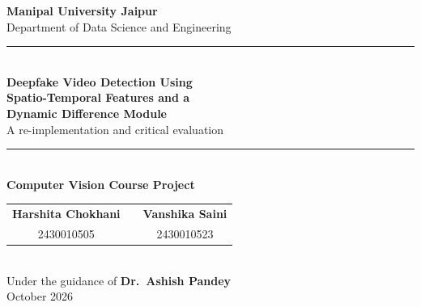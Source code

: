 \documentclass[11pt,a4paper]{article}
\begin{document}
\begin{center}
{\large\textbf{Manipal University Jaipur}}\\[2pt]
Department of Data Science and Engineering\\[10pt]
\rule{\linewidth}{0.6pt}\\[6pt]
{\LARGE\bfseries Deepfake Video Detection Using\\[2pt] Spatio-Temporal Features and a\\[2pt] Dynamic Difference Module}\\[4pt]
{\large A re-implementation and critical evaluation}\\[2pt]
\rule{\linewidth}{0.6pt}\\[8pt]
\textbf{Computer Vision Course Project}\\[8pt]
\begin{tabular}{ccc}
\textbf{Harshita Chokhani} & \hspace{2em} & \textbf{Vanshika Saini}\\
2430010505 & & 2430010523\\
\end{tabular}\\[8pt]
Under the guidance of \textbf{Dr.\ Ashish Pandey}\\[2pt]
October 2026
\end{center}

\begin{abstract}
\noindent Deepfake videos are produced frame by frame, so they often contain small geometric and temporal inconsistencies that a viewer does not notice. AbdElfattah et al.\ (Scientific Reports, 2026) propose a detector that combines VGG16 frame features, Dlib facial-landmark geometry, an LSTM, a Transformer encoder and a Dynamic Difference Module (DDM) that measures abrupt frame-to-frame change, and they report accuracies close to 100\% on three benchmarks. In this project we re-implemented that pipeline from the paper's description using PyTorch and trained it on the DFDC face-crop training sample from Kaggle. We describe every stage, state which settings come from the paper and which we had to assume, and report the results of the full model and of the paper's ablation. On our balanced subset (116 videos, 24 of them held out for testing) the model did not generalise: test accuracy was 50\%, and the model gave almost the same score to every video. We discuss why this probably happened, which details the paper leaves open, and what would be needed for a fair reproduction.
\end{abstract}
\end{document}
